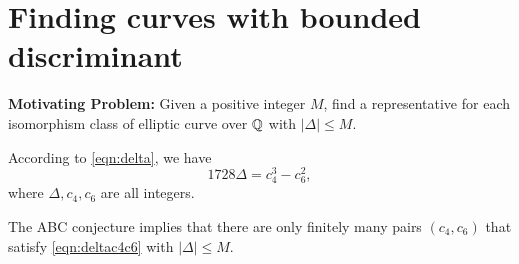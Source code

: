 \documentclass{book}
\begin{document}
\section{Finding curves with bounded discriminant}

{\bf Motivating Problem: } Given a positive integer $M$, find
a representative for each
isomorphism class of elliptic curve over $\mathbb{Q}$
with $|\Delta|\leq M$.

According to \eqref{eqn:delta}, we have
\begin{equation}\label{eqn:deltac4c6}
1728\Delta = c_4^3 - c_6^2,
\end{equation}
where $\Delta, c_4, c_6$ are all integers.

\begin{theorem}\label{thm:abcdisc}
The ABC conjecture implies
that there are only finitely
many pairs $(c_4, c_6)$ that satisfy
\eqref{eqn:deltac4c6} with
$|\Delta|\leq M$.
\end{theorem}
\end{document}
